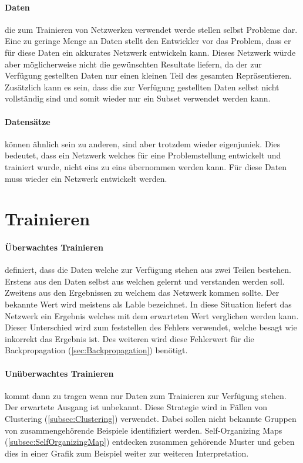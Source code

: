 \paragraph{Daten} die zum Trainieren von Netzwerken verwendet werde stellen selbst Probleme dar.
Eine zu geringe Menge an Daten stellt den Entwickler vor das Problem, dass er für diese Daten ein akkurates Netzwerk entwickeln kann.
Dieses Netzwerk würde aber möglicherweise nicht die gewünschten Resultate liefern, da der zur Verfügung gestellten Daten nur einen kleinen Teil des gesamten Repräsentieren.
Zusätzlich kann es sein, dass die zur Verfügung gestellten Daten selbst nicht vollständig sind und somit wieder nur ein Subset verwendet werden kann.

\paragraph{Datensätze} können ähnlich sein zu anderen, sind aber trotzdem wieder eigen\/juniek.
Dies bedeutet, dass ein Netzwerk welches für eine Problemstellung entwickelt und trainiert wurde, nicht eins zu eins übernommen werden kann.
Für diese Daten muss wieder ein Netzwerk entwickelt werden.

\section{Trainieren}

\paragraph{Überwachtes Trainieren} definiert, dass die Daten welche zur Verfügung stehen aus zwei Teilen bestehen.
Erstens aus den Daten selbst aus welchen gelernt und verstanden werden soll.
Zweitens aus den Ergebnissen zu welchem das Netzwerk kommen sollte.
Der bekannte Wert wird meistens als Lable bezeichnet. 
In diese Situation liefert das Netzwerk ein Ergebnis welches mit dem erwarteten Wert verglichen werden kann.
Dieser Unterschied wird zum feststellen des Fehlers verwendet, welche besagt wie inkorrekt das Ergebnis ist.
Des weiteren wird diese Fehlerwert für die Backpropagation (\ref{sec:Backpropagation}) benötigt.

\paragraph{Unüberwachtes Trainieren} kommt dann zu tragen wenn nur Daten zum Trainieren zur Verfügung stehen.
Der erwartete Ausgang ist unbekannt.
Diese Strategie wird in Fällen von Clustering (\ref{subsec:Clustering}) verwendet.
Dabei sollen nicht bekannte Gruppen von zusammengehörende Beispiele identifiziert werden. 
Self-Organizing Maps (\ref{subsec:SelfOrganizingMap}) entdecken zusammen gehörende Muster und geben dies in einer Grafik zum Beispiel weiter zur weiteren Interpretation.

